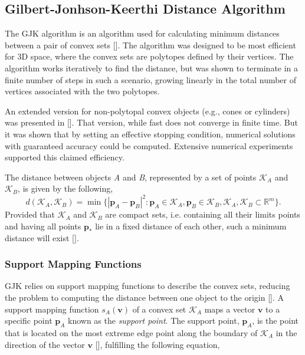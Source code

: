 \subsection{Gilbert-Jonhson-Keerthi Distance Algorithm}

The \gls{GJK} algorithm is an algorithm used for calculating minimum distances between a pair of convex sets [\citeauthor{Gilbert1987}]. The algorithm was designed to be most efficient for 3D space, where the convex sets are polytopes defined by their vertices. The algorithm works iteratively to find the distance, but was shown to terminate in a finite number of steps in such a scenario, growing linearly in the total number of vertices associated with the two polytopes. 

An extended version for non-polytopal convex objects (e.g., cones or cylinders) was presented in [\citeauthor{Gilbert1990}]. That version, while fast does not converge in finite time. But it was shown that by setting an effective stopping condition, numerical solutions with guaranteed accuracy could be computed. Extensive numerical experiments supported this claimed efficiency.

The distance between objects \textit{A} and \textit{B}, represented by a set of points $\mathcal{K}_A$ and $\mathcal{K}_B$, is given by the following,
\begin{equation}
d(\mathcal{K}_A,\mathcal{K}_B) = \min \{|\textbf{p}_A - \textbf{p}_B|^2 : \textbf{p}_A \in \mathcal{K}_A, \textbf{p}_B \in \mathcal{K}_B,  \mathcal{K}_A, \mathcal{K}_B \subset \mathbb{R}^m\}.
\end{equation}
Provided that $\mathcal{K}_A$ and $\mathcal{K}_B$ are compact sets, i.e. containing all their limits points and having all points $\textbf{p}_*$ lie in a fixed distance of each other, such a minimum distance will exist [\citeauthor{Gilbert1987}].

\subsubsection{Support Mapping Functions}

\gls{GJK} relies on support mapping functions to describe the convex sets, reducing the problem to computing the distance between one object to the origin [\citeauthor{Lindemann2009}]. A support mapping function $s_A(\textbf{v})$ of a convex set $\mathcal{K}_A$ maps a vector $\textbf{v}$ to a specific point $\textbf{p}_A$ known as the \textit{support point}. The support point, $\textbf{p}_A$, is the point that is located on the most extreme edge point along the boundary of $\mathcal{K}_A$ in the direction of the vector $\textbf{v}$ [\citeauthor{Lindemann2009}], fulfilling the following equation,

